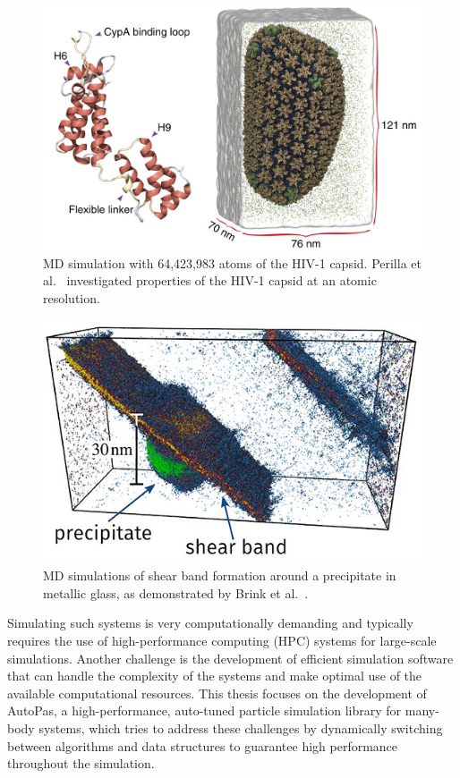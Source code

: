 \begin{multicols*}{2}
    \begin{figure}[H]
        \centering
        \includegraphics[width=0.9\columnwidth, trim={0cm 0 0cm 0cm}]{figures/Intro/HIV-1.png}
        \caption{MD simulation with 64,423,983 atoms of the HIV-1 capsid. Perilla et al.~\cite{Perilla2017} investigated properties of the HIV-1 capsid at an atomic resolution.}
        \label{fig:hiv_capsid}
    \end{figure}

    \begin{figure}[H]
        \centering
        \includegraphics[width=0.9\columnwidth,trim={0cm 0 0cm 0cm}]{figures/Intro/metallic-glass-crack.jpg}
        \caption{MD simulations of shear band formation around a precipitate in metallic glass, as demonstrated by Brink et al.~\cite{Brink2016}.}
        \label{fig:md_simulation_loop}
    \end{figure}
\end{multicols*}

Simulating such systems is very computationally demanding and typically requires the use of high-performance computing (HPC) systems for large-scale simulations. Another challenge is the development of efficient simulation software that can handle the complexity of the systems and make optimal use of the available computational resources. This thesis focuses on the development of AutoPas, a high-performance, auto-tuned particle simulation library for many-body systems, which tries to address these challenges by dynamically switching between algorithms and data structures to guarantee high performance throughout the simulation.

